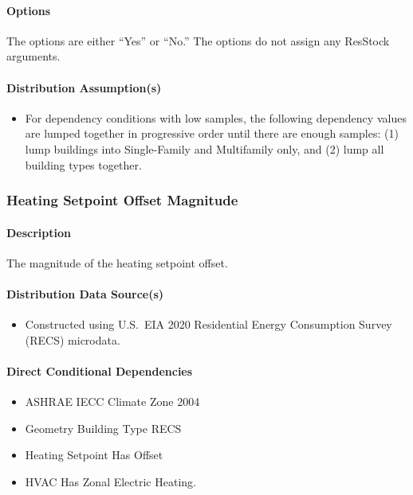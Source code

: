\paragraph{Options}
The options are either ``Yes'' or ``No.'' The options do not assign any ResStock arguments.

\paragraph{Distribution Assumption(s)}
\begin{itemize}
    \item For dependency conditions with low samples, the following dependency values are lumped together in progressive order until there are enough samples: (1) lump buildings into Single-Family and Multifamily only, and (2) lump all building types together.
\end{itemize}

\subsubsection{Heating Setpoint Offset Magnitude}
\paragraph{Description}
The magnitude of the heating setpoint offset.

\paragraph{Distribution Data Source(s)}
\begin{itemize}
    \item Constructed using U.S.~EIA 2020 Residential Energy Consumption Survey (RECS) microdata.
\end{itemize}

\paragraph{Direct Conditional Dependencies}
\begin{itemize}
    \item ASHRAE IECC Climate Zone 2004
    \item Geometry Building Type RECS
    \item Heating Setpoint Has Offset
    \item HVAC Has Zonal Electric Heating.
\end{itemize}

